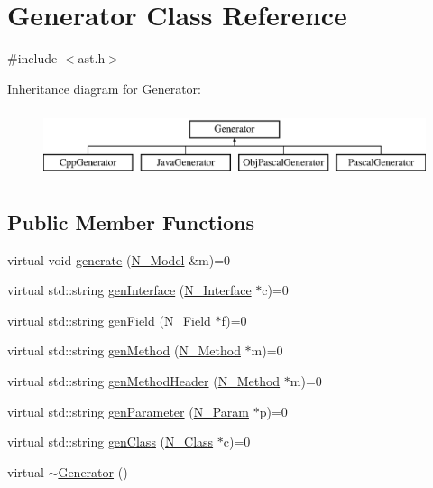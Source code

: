\hypertarget{classGenerator}{}\section{Generator Class Reference}
\label{classGenerator}


{\ttfamily \#include $<$ast.\+h$>$}

Inheritance diagram for Generator\+:\begin{figure}[H]
\begin{center}
\leavevmode
\includegraphics[height=2.000000cm]{classGenerator}
\end{center}
\end{figure}
\subsection*{Public Member Functions}
\begin{DoxyCompactItemize}
\item 
virtual void \hyperlink{classGenerator_a518161ca79e68d733687f8e2985abd16}{generate} (\hyperlink{classN__Model}{N\+\_\+\+Model} \&m)=0
\item 
virtual std\+::string \hyperlink{classGenerator_ad0f09fcc0e99e78e04f8c202cd0ce881}{gen\+Interface} (\hyperlink{classN__Interface}{N\+\_\+\+Interface} $\ast$c)=0
\item 
virtual std\+::string \hyperlink{classGenerator_aa2871c303fba42abd61a7ed997d23416}{gen\+Field} (\hyperlink{classN__Field}{N\+\_\+\+Field} $\ast$f)=0
\item 
virtual std\+::string \hyperlink{classGenerator_a2b09ae359674038af5286fbd03d83c41}{gen\+Method} (\hyperlink{classN__Method}{N\+\_\+\+Method} $\ast$m)=0
\item 
virtual std\+::string \hyperlink{classGenerator_aede7f5343c5bcd88b5fc8bfe51d17bce}{gen\+Method\+Header} (\hyperlink{classN__Method}{N\+\_\+\+Method} $\ast$m)=0
\item 
virtual std\+::string \hyperlink{classGenerator_ac9871b3d5874cb81a98a3e5eb3b703e2}{gen\+Parameter} (\hyperlink{classN__Param}{N\+\_\+\+Param} $\ast$p)=0
\item 
virtual std\+::string \hyperlink{classGenerator_afac361fceae302fb09e8170d097415d4}{gen\+Class} (\hyperlink{classN__Class}{N\+\_\+\+Class} $\ast$c)=0
\item 
virtual \hyperlink{classGenerator_aeb355d65ed59bc5738a5b3e9637186e1}{$\sim$\+Generator} ()
\end{DoxyCompactItemize}
